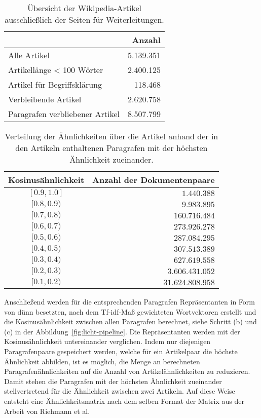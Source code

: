 \begin{table}
\centering
\begin{tabular}{l r}
  \hline
  & Anzahl \\
  \hline
  Alle Artikel  & 5.139.351 \\
  Artikellänge < 100 Wörter & 2.400.125 \\
  Artikel für Begriffsklärung & 118.468 \\
  \hline
  Verbleibende Artikel & 2.620.758 \\
  Paragrafen verbliebener Artikel & 8.507.799 \\
  \hline
\end{tabular}
\caption{Übersicht der Wikipedia-Artikel ausschließlich der Seiten für Weiterleitungen. \cite{licht:2017}}
\label{tab:simMatrix-overview}
\end{table}

\begin{table}
\centering
\begin{tabular}{c r}
  \hline
  Kosinus\"ahnlichkeit & Anzahl der Dokumentenpaare \\
  \hline
  $[0.9,1.0]$ & $1.440.388$\\
  $[0.8,0.9)$ & $9.983.895$\\
  $[0.7,0.8)$ & $160.716.484$\\
  $[0.6,0.7)$ & $273.926.278$\\
  $[0.5,0.6)$ & $287.084.295$\\
  $[0.4,0.5)$ & $307.513.389$\\
  $[0.3,0.4)$ & $627.619.558$\\
  $[0.2,0.3)$ & $3.606.431.052$\\
  $[0.1,0.2)$ & $31.624.808.958$\\
  \hline
\end{tabular}
\caption{Verteilung der Ähnlichkeiten über die Artikel anhand der in den Artikeln enthaltenen Paragrafen mit der höchsten Ähnlichkeit zueinander. \cite{licht:2017}}
\label{tab:simMatrix-overview-sims}
\end{table}

Anschließend werden für die entsprechenden Paragrafen Repräsentanten in Form von dünn besetzten, nach dem Tf-idf-Maß gewichteten Wortvektoren erstellt und die Kosinusähnlichkeit zwischen allen Paragrafen berechnet, siehe Schritt (b) und (c) in der Abbildung~\ref{fig:licht-pipeline}.
Die Repräsentanten werden mit der Kosinusähnlichkeit untereinander verglichen.
Indem nur diejenigen Paragrafenpaare gespeichert werden, welche für ein Artikelpaar die höchste Ähnlichkeit abbilden, ist es möglich, die Menge an berechneten Paragrafenähnlichkeiten auf die Anzahl von Artikelähnlichkeiten zu reduzieren.
Damit stehen die Paragrafen mit der höchsten Ähnlichkeit zueinander stellvertretend für die Ähnlichkeit zwischen zwei Artikeln.
Auf diese Weise entsteht eine Ähnlichkeitsmatrix nach dem selben Format der Matrix aus der Arbeit von Riehmann et al.



